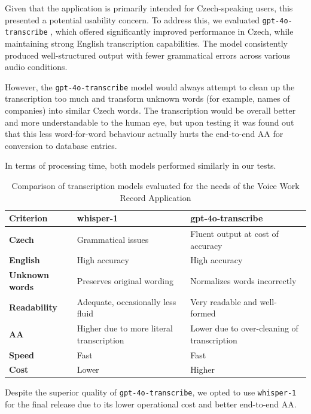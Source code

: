 \documentclass[
  digital,     %
  oneside,     %
  nosansbold,  %
  nocolorbold, %
  lof,         %
  lot,         %
]{fithesis4}
\begin{document}
Given that the application is primarily intended for Czech-speaking users, this presented a potential usability concern. To address this, we evaluated \texttt{gpt-4o-transcribe} , which offered significantly improved performance in Czech, while maintaining strong English transcription capabilities. The model consistently produced well-structured output with fewer grammatical errors across various audio conditions.

However, the \texttt{gpt-4o-transcribe} model would always attempt to clean up the transcription too much and transform unknown words (for example, names of companies) into similar Czech words. The transcription would be overall better and more understandable to the human eye, but upon testing it was found out that this less word-for-word behaviour actually hurts the end-to-end \gls{AA} for conversion to database entries.

In terms of processing time, both models performed similarly in our tests. 

\shorthandon{-}

\begin{table}[H]
\centering
\begin{tabularx}{\textwidth}{|X|X|X|}
\hline
\textbf{Criterion} & \textbf{whisper-1} & \textbf{gpt-4o-transcribe} \\
\hline
\textbf{Czech} & Grammatical issues & Fluent output at cost of accuracy \\
\hline
\textbf{English} & High accuracy & High accuracy \\
\hline
\textbf{Unknown words} & Preserves original wording & Normalizes words incorrectly \\
\hline
\textbf{Readability} & Adequate, occasionally less fluid & Very readable and well-formed \\
\hline
\textbf{\gls{AA}} & Higher due to more literal transcription & Lower due to over-cleaning of transcription \\
\hline
\textbf{Speed} & Fast & Fast \\
\hline
\textbf{Cost} & Lower & Higher \\
\hline
\end{tabularx}
\caption{Comparison of transcription models evaluated for the needs of the Voice Work Record Application}
\label{tab:transcription_models}
\end{table}

Despite the superior quality of \texttt{gpt-4o-transcribe}, we opted to use \texttt{whisper-1} for the final release due to its lower operational cost and better end-to-end \gls{AA}.
\end{document}
